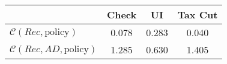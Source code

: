 \begin{tabular}{@{}lccc@{}}
\toprule
                          & Check      & UI    & Tax Cut    \\  \midrule
$\mathcal{C}(Rec,\text{policy})$ & 0.078  & 0.283  & 0.040     \\
$\mathcal{C}(Rec, AD,\text{policy})$ & 1.285  & 0.630  & 1.405     \\
\end{tabular}
